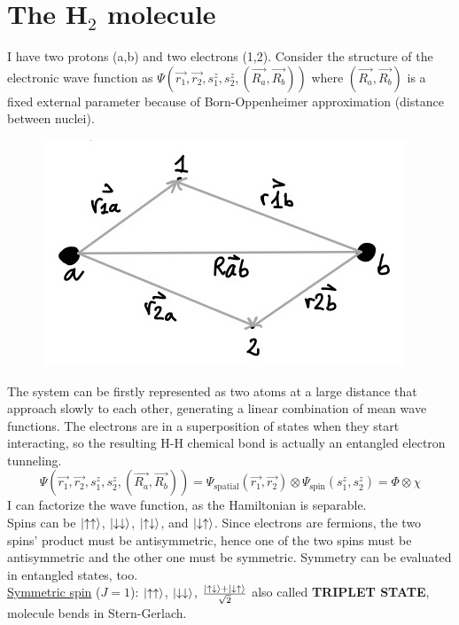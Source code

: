 \section{The H$_2$ molecule}
I have two protons (a,b) and two electrons (1,2). Consider the structure of the electronic wave function as $\Psi(\vec{r_1},\vec{r_2},s_1^z,s_2^z,(\vec{R_a},\vec{R_b}))$ where $(\vec{R_a},\vec{R_b})$ is a fixed external parameter because of Born-Oppenheimer approximation (distance between nuclei).\\
\begin{figure}[htbp!]
	\centering
	\includegraphics[scale=0.30]{img_8}
\end{figure}
\newline
The system can be firstly represented as two atoms at a large distance that approach slowly to each other, generating a linear combination of mean wave functions. The electrons are in a superposition of states when they start interacting, so the resulting H-H chemical bond is actually an entangled electron tunneling.
\[
\Psi(\vec{r_1},\vec{r_2},s_1^z,s_2^z,(\vec{R_a},\vec{R_b}))=\Psi_{\text{spatial}}(\vec{r_1},\vec{r_2})\otimes\Psi_{\text{spin}}(s_1^z,s_2^z)=\Phi\otimes\chi
\]
I can factorize the wave function, as the Hamiltonian is separable.\\
Spins can be $\ket{\uparrow\uparrow}$, $\ket{\downarrow\downarrow}$, $\ket{\uparrow\downarrow}$, and $\ket{\downarrow\uparrow}$. Since electrons are fermions, the two spins' product must be antisymmetric, hence one of the two spins must be antisymmetric and the other one must be symmetric. Symmetry can be evaluated in entangled states, too. \\
\newline
\underline{Symmetric spin} ($J=1$): $\ket{\uparrow\uparrow}$, $\ket{\downarrow\downarrow}$, $\frac{\ket{\uparrow\downarrow}+\ket{\downarrow\uparrow}}{\sqrt{2}}$ also called \textbf{TRIPLET STATE}, molecule bends in Stern-Gerlach.\\

